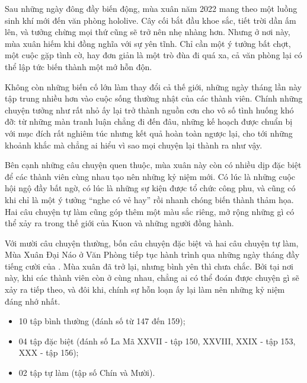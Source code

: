 \documentclass[main.tex]{subfiles}
\begin{document}
Sau những ngày đông đầy biến động, mùa xuân năm 2022 mang theo một luồng sinh khí mới đến văn phòng hololive. Cây cối bắt đầu khoe sắc, tiết trời dần ấm lên, và tưởng chừng mọi thứ cũng sẽ trở nên nhẹ nhàng hơn. Nhưng ở nơi này, mùa xuân hiếm khi đồng nghĩa với sự yên tĩnh. Chỉ cần một ý tưởng bất chợt, một cuộc gặp tình cờ, hay đơn giản là một trò đùa đi quá xa, cả văn phòng lại có thể lập tức biến thành một mớ hỗn độn.

Không còn những biến cố lớn làm thay đổi cả thế giới, những ngày tháng lần này tập trung nhiều hơn vào cuộc sống thường nhật của các thành viên. Chính những chuyện tưởng như rất nhỏ ấy lại trở thành nguồn cơn cho vô số tình huống khó đỡ: từ những màn tranh luận chẳng đi đến đâu, những kế hoạch được chuẩn bị với mục đích rất nghiêm túc nhưng kết quả hoàn toàn ngược lại, cho tới những khoảnh khắc mà chẳng ai hiểu vì sao mọi chuyện lại thành ra như vậy.

Bên cạnh những câu chuyện quen thuộc, mùa xuân này còn có nhiều dịp đặc biệt để các thành viên cùng nhau tạo nên những kỷ niệm mới. Có lúc là những cuộc hội ngộ đầy bất ngờ, có lúc là những sự kiện được tổ chức công phu, và cũng có khi chỉ là một ý tưởng ``nghe có vẻ hay'' rồi nhanh chóng biến thành thảm họa. Hai câu chuyện tự làm cũng góp thêm một màu sắc riêng, mở rộng những gì có thể xảy ra trong thế giới của Kuon và những người đồng hành.

Với mười câu chuyện thường, bốn câu chuyện đặc biệt và hai câu chuyện tự làm, Mùa Xuân Đại Náo ở Văn Phòng tiếp tục hành trình qua những ngày tháng đầy tiếng cười của \hll. Mùa xuân đã trở lại, nhưng bình yên thì chưa chắc. Bởi tại nơi này, khi các thành viên còn ở cùng nhau, chẳng ai có thể đoán được chuyện gì sẽ xảy ra tiếp theo, và đôi khi, chính sự hỗn loạn ấy lại làm nên những kỷ niệm đáng nhớ nhất.

{}
\begin{itemize}
    \item 10 tập bình thường (đánh số từ 147 đến 159);
    \item 04 tập đặc biệt (đánh số La Mã XXVII - tập 150, XXVIII, XXIX - tập 153, XXX - tập 156);
    \item 02 tập tự làm (tập số Chín và Mười).
\end{itemize}
\end{document}
